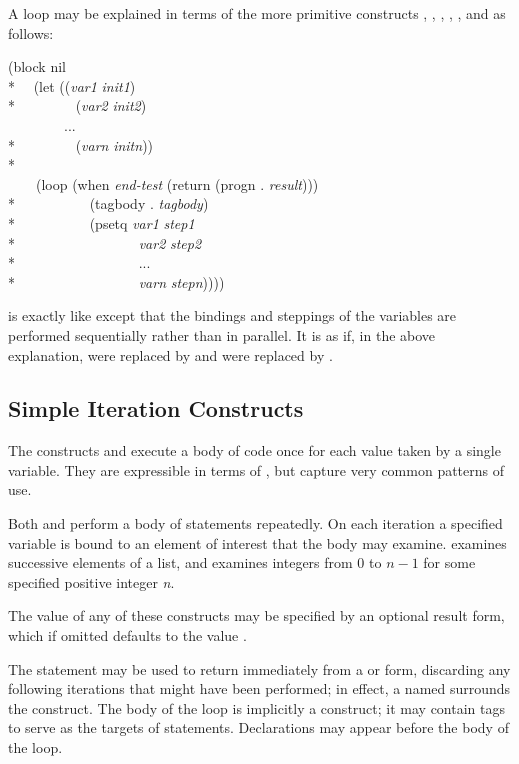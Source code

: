 \begin{defmac}
A  loop may be explained in terms of the more primitive constructs
, , , , ,
and  as follows:
\begin{lisp}
(block nil \\*
~~(let ((\emph{var1} \emph{init1}) \\*
~~~~~~~~(\emph{var2} \emph{init2}) \\
~~~~~~~~... \\*
~~~~~~~~(\emph{varn} \emph{initn})) \\*
~~~~ \\
~~~~(loop (when \emph{end-test} (return (progn . \emph{result}))) \\*
~~~~~~~~~~(tagbody . \emph{tagbody}) \\*
~~~~~~~~~~(psetq \emph{var1} \emph{step1} \\*
~~~~~~~~~~~~~~~~~\emph{var2} \emph{step2} \\*
~~~~~~~~~~~~~~~~~... \\*
~~~~~~~~~~~~~~~~~\emph{varn} \emph{stepn}))))
\end{lisp}
 is exactly like  except that the bindings and steppings
of the variables are performed sequentially rather than in parallel.
It is as if, in the above explanation,
 were replaced by  and  were replaced
by .
\end{defmac}

\subsection{Simple Iteration Constructs}

The constructs  and  execute a body of code
once for each value taken by a single variable.  They are expressible
in terms of , but capture very common patterns of use.

Both  and  perform
a body of statements repeatedly.  On each iteration a specified
variable is bound to an element of interest that the body may
examine.   examines successive elements of a list,
and  examines integers from 0 to $n-1$
for some specified positive integer \emph{n}.

The value of any of these constructs may be specified by an optional result
form, which if omitted defaults to the value {\false}.

The  statement may be used to return
immediately from a  or  form,
discarding any following iterations
that might have been performed; in effect, a  named {\nil}
surrounds the construct.
The body of the loop is implicitly a  construct;
it may contain tags to serve as the targets of  statements.
Declarations may appear before the body of the loop.

